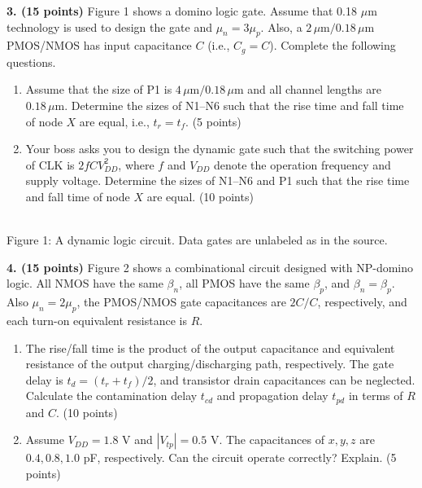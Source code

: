 \documentclass[10pt]{article}
\newcommand{\mos}[4]{\begin{scope}[shift={(#1,#2)}]
\draw (0,.24)--(0,-.24);\draw (0,.20)--(.25,.20)--(.25,.5);
\draw (0,-.20)--(.25,-.20)--(.25,-.5);\draw (-.16,.23)--(-.16,-.23);
\ifnum#4=1\draw (-.26,0) circle (.06);\draw (-.75,0)--(-.32,0);\else\draw (-.75,0)--(-.16,0);\fi
\node[anchor=east,font=\scriptsize] at (-.76,0) {$#3$};\end{scope}}
\newcommand{\ground}[2]{\draw (#1,#2)--(#1,{#2-.12});\draw ({#1-.17},{#2-.12})--({#1+.17},{#2-.12});\draw ({#1-.11},{#2-.20})--({#1+.11},{#2-.20});}
\newcommand{\rail}[3]{\draw (#1,#2)--(#1,{#2+.14});\node[above,font=\scriptsize] at (#1,{#2+.14}) {$#3$};}
\begin{document}
\textbf{3. (15 points)} Figure 1 shows a domino logic gate. Assume that 0.18 $\mu$m technology is used to design the gate and $\mu_n=3\mu_p$. Also, a $2\,\mu\mathrm m/0.18\,\mu\mathrm m$ PMOS/NMOS has input capacitance $C$ (i.e., $C_g=C$). Complete the following questions.
\begin{enumerate}[label=(\alph*),leftmargin=7mm]
\item Assume that the size of P1 is $4\,\mu\mathrm m/0.18\,\mu\mathrm m$ and all channel lengths are $0.18\,\mu\mathrm m$. Determine the sizes of N1--N6 such that the rise time and fall time of node $X$ are equal, i.e., $t_r=t_f$. (5 points)
\item Your boss asks you to design the dynamic gate such that the switching power of CLK is $2fCV_{DD}^{2}$, where $f$ and $V_{DD}$ denote the operation frequency and supply voltage. Determine the sizes of N1--N6 and P1 such that the rise time and fall time of node $X$ are equal. (10 points)
\end{enumerate}
\begin{center}\\Figure 1: A dynamic logic circuit. Data gates are unlabeled as in the source.\end{center}
\newpage
\textbf{4. (15 points)} Figure 2 shows a combinational circuit designed with NP-domino logic. All NMOS have the same $\beta_n$, all PMOS have the same $\beta_p$, and $\beta_n=\beta_p$. Also $\mu_n=2\mu_p$, the PMOS/NMOS gate capacitances are $2C/C$, respectively, and each turn-on equivalent resistance is $R$.
\begin{enumerate}[label=(\alph*),leftmargin=7mm]
\item The rise/fall time is the product of the output capacitance and equivalent resistance of the output charging/discharging path, respectively. The gate delay is $t_d=(t_r+t_f)/2$, and transistor drain capacitances can be neglected. Calculate the contamination delay $t_{cd}$ and propagation delay $t_{pd}$ in terms of $R$ and $C$. (10 points)
\item Assume $V_{DD}=1.8$ V and $|V_{tp}|=0.5$ V. The capacitances of $x,y,z$ are $0.4,0.8,1.0$ pF, respectively. Can the circuit operate correctly? Explain. (5 points)
\end{enumerate}
\end{document}
